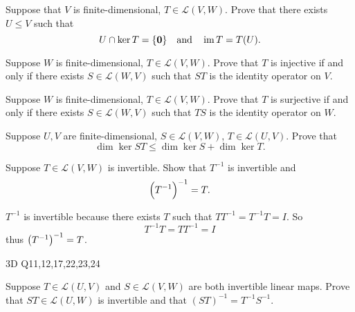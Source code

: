 \begin{exercise}
Suppose that $V$ is finite-dimensional, $T\in\mathcal{L}(V,W)$. Prove that there exists $U\le V$ such that
\[U\cap\ker T=\{\vb{0}\}\quad\text{and}\quad\operatorname{im} T=T(U).\]
\end{exercise}

\begin{solution}

\end{solution}

\begin{exercise}
Suppose $W$ is finite-dimensional, $T\in\mathcal{L}(V,W)$. Prove that $T$ is injective if and only if there exists $S\in\mathcal{L}(W,V)$ such that $ST$ is the identity operator on $V$.
\end{exercise}

\begin{solution}

\end{solution}

\begin{exercise}
Suppose $W$ is finite-dimensional, $T\in\mathcal{L}(V,W)$. Prove that $T$ is surjective if and only if there exists $S\in\mathcal{L}(W,V)$ such that $TS$ is the identity operator on $W$.
\end{exercise}

\begin{exercise}
Suppose $U,V$ are finite-dimensional, $S\in\mathcal{L}(V,W)$, $T\in\mathcal{L}(U,V)$. Prove that
\[\dim\ker ST\le\dim\ker S+\dim\ker T.\]
\end{exercise}

\begin{solution}

\end{solution}

\begin{exercise}
Suppose $T\in\mathcal{L}(V,W)$ is invertible. Show that $T^{-1}$ is invertible and
\[\left(T^{-1}\right)^{-1}=T.\]
\end{exercise}

\begin{solution}
$T^{-1}$ is invertible because there exists $T$ such that $TT^{-1}=T^{-1}T=I$. So
\[T^{-1}T=TT^{-1}=I\]
thus $\left(T^{-1}\right)^{-1}=T$.
\end{solution}

3D Q11,12,17,22,23,24

\begin{exercise}
Suppose $T\in\mathcal{L}(U,V)$ and $S\in\mathcal{L}(V,W)$ are both invertible linear maps. Prove that $ST\in\mathcal{L}(U,W)$ is invertible and that $(ST)^{-1}=T^{-1}S^{-1}$.
\end{exercise}

